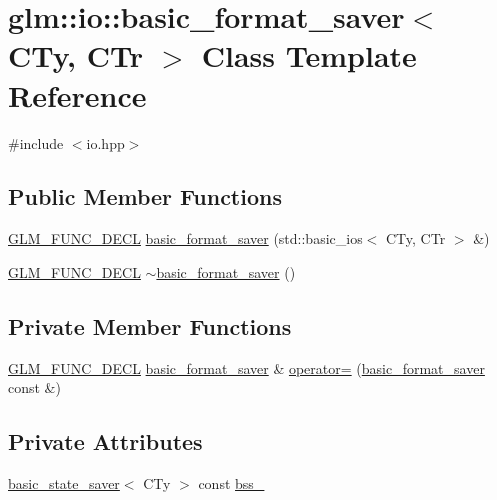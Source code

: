 \hypertarget{classglm_1_1io_1_1basic__format__saver}{}\section{glm\+:\+:io\+:\+:basic\+\_\+format\+\_\+saver$<$ C\+Ty, C\+Tr $>$ Class Template Reference}
\label{classglm_1_1io_1_1basic__format__saver}


{\ttfamily \#include $<$io.\+hpp$>$}

\subsection*{Public Member Functions}
\begin{DoxyCompactItemize}
\item 
\hyperlink{setup_8hpp_ab2d052de21a70539923e9bcbf6e83a51}{G\+L\+M\+\_\+\+F\+U\+N\+C\+\_\+\+D\+E\+CL} \hyperlink{classglm_1_1io_1_1basic__format__saver_a9688fa6dce0c32285527df2336ca9127}{basic\+\_\+format\+\_\+saver} (std\+::basic\+\_\+ios$<$ C\+Ty, C\+Tr $>$ \&)
\item 
\hyperlink{setup_8hpp_ab2d052de21a70539923e9bcbf6e83a51}{G\+L\+M\+\_\+\+F\+U\+N\+C\+\_\+\+D\+E\+CL} \hyperlink{classglm_1_1io_1_1basic__format__saver_a49d58d91548a071d5f660c74ca88979b}{$\sim$basic\+\_\+format\+\_\+saver} ()
\end{DoxyCompactItemize}
\subsection*{Private Member Functions}
\begin{DoxyCompactItemize}
\item 
\hyperlink{setup_8hpp_ab2d052de21a70539923e9bcbf6e83a51}{G\+L\+M\+\_\+\+F\+U\+N\+C\+\_\+\+D\+E\+CL} \hyperlink{classglm_1_1io_1_1basic__format__saver}{basic\+\_\+format\+\_\+saver} \& \hyperlink{classglm_1_1io_1_1basic__format__saver_a3d4f0a9fd357a611f81b17443cf5276b}{operator=} (\hyperlink{classglm_1_1io_1_1basic__format__saver}{basic\+\_\+format\+\_\+saver} const \&)
\end{DoxyCompactItemize}
\subsection*{Private Attributes}
\begin{DoxyCompactItemize}
\item 
\hyperlink{classglm_1_1io_1_1basic__state__saver}{basic\+\_\+state\+\_\+saver}$<$ C\+Ty $>$ const \hyperlink{classglm_1_1io_1_1basic__format__saver_a5d2b333a0879f294698c266fa4a7792b}{bss\+\_\+}
\end{DoxyCompactItemize}


